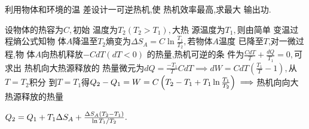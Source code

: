 \documentclass{ctexart}
\begin{document}
利用物体和环境的温%
差设计一可逆热机,使%
热机效率最高,求最大%
输出功.

设物体的热容为$C,$初始%
温度为$T_{2}\left( T_{2}>T_{1}\right) ,$大热%
源温度为$T_{1},$则由简单%
变温过程熵公式知物%
体$A$降温至$T_{2}$熵变为$\Delta
S_{A}=C\ln \frac{T_{1}}{T_{2}},$若物体$A$温度%
已降至$T$,对一微过程,物%
体$A$向热机释放$-CdT\left( dT<0\right) $%
的热量,热机可逆的条%
件为$\frac{CdT}{T}+\frac{dQ}{T_{1}}=0,$可求出%
热机向大热源释放的%
热量微元为$dQ=\frac{-T_{1}}{T}CdT\implies
dW=CdT\left( \frac{T_{1}}{T}-1\right) ,$从$T=T_{2}$积分%
到$T=T_{1}$得$Q_{2}-Q_{1}=W=C\left( T_{2}-T_{1}+T_{1}\ln \frac{%
T_{1}}{T_{2}}\right) \implies $热机向向大%
热源释放的热量

$Q_{2}=Q_{1}+T_{1}\Delta S_{A}+\frac{\Delta S_{A}\left( T_{2}-T_{1}\right) }{%
\ln T_{1}/T_{2}}.$
\end{document}
